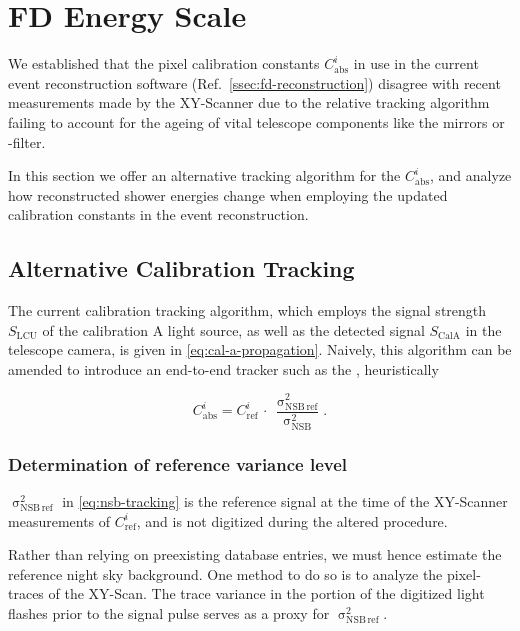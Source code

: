 \newpage

\section{FD Energy Scale}
\label{sec:fd-energy-scale}


We established that the pixel calibration constants $C^i_\mathrm{abs}$
in use in the current \FD event reconstruction software
(Ref.~\cref{ssec:fd-reconstruction}) disagree with recent measurements made by
the XY-Scanner due to the relative tracking algorithm failing to account for
the ageing of vital telescope components like the mirrors or \UV-filter.

In this section we offer an alternative tracking algorithm for the 
$C^i_\mathrm{abs}$, and analyze how reconstructed shower energies change when 
employing the updated calibration constants in the event reconstruction.

\subsection{Alternative Calibration Tracking}

The current \FD calibration tracking algorithm, which employs the signal 
strength $S_\mathrm{LCU}$ of the calibration A light source, as well as the 
detected signal $S_\mathrm{CalA}$ in the telescope camera, is given in 
\cref{eq:cal-a-propagation}. Naively, this algorithm can be amended to
introduce an end-to-end tracker such as the \NSB, heuristically

\begin{equation}
\label{eq:nsb-tracking}
C^i_\mathrm{abs} = C^i_\mathrm{ref}\,\cdot\,\frac{\upsigma^2_{\mathrm{NSB}\,\mathrm{ref}}}{\upsigma^2_{\mathrm{NSB}}}.
\end{equation}

\subsubsection{Determination of reference variance level}
\label{sssec:nsb-during-xy-scans}

$\upsigma^2_{\mathrm{NSB}\,\mathrm{ref}}$ in \cref{eq:nsb-tracking} is the 
reference \NSB signal at the time of the XY-Scanner measurements of 
$C^i_\mathrm{ref}$, and is not digitized during the altered \DAQ procedure. 

Rather than relying on preexisting database entries, we must hence estimate the
reference night sky background. One method to do so is to analyze the 
pixel-\PMT traces of the XY-Scan. The trace variance in the portion of the 
digitized light flashes prior to the signal pulse serves as a proxy for 
$\upsigma^2_{\mathrm{NSB}\,\mathrm{ref}}$. 

